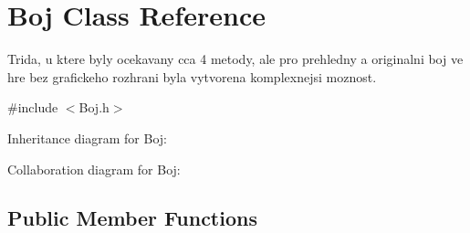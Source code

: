 \hypertarget{class_boj}{\section{Boj Class Reference}
\label{class_boj}
}


Trida, u ktere byly ocekavany cca 4 metody, ale pro prehledny a originalni boj ve hre bez grafickeho rozhrani byla vytvorena komplexnejsi moznost.  




{\ttfamily \#include $<$Boj.\-h$>$}



Inheritance diagram for Boj\-:


Collaboration diagram for Boj\-:
\subsection*{Public Member Functions}
